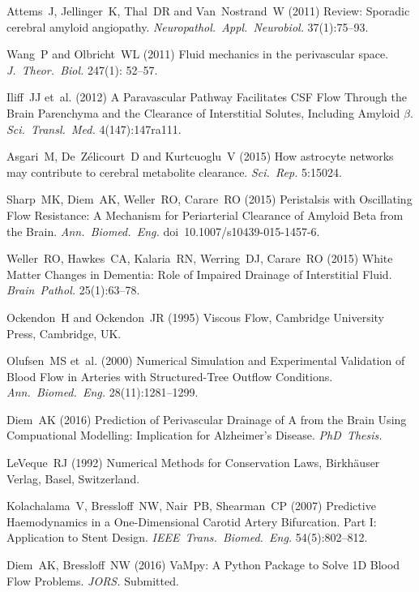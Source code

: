\documentclass{frontiersFPHY} %
\newcommand{\Ab}{A\textbeta\xspace}
\begin{document}
\begin{thebibliography}{10}
Attems~J, Jellinger~K, Thal~DR and Van~Nostrand~W (2011) Review: Sporadic cerebral amyloid angiopathy. {\em Neuropathol.~Appl.~Neurobiol.} 37(1):75--93.

Wang~P and Olbricht~WL (2011) Fluid mechanics in the perivascular space. {\em J.~Theor.~Biol.} 247(1): 52--57.

Iliff~JJ et~al. (2012) A Paravascular Pathway Facilitates CSF Flow Through the Brain Parenchyma and the Clearance of Interstitial Solutes, Including Amyloid $\beta$. {\em Sci.~Transl.~Med.} 4(147):147ra111.

Asgari~M, De~Z\'elicourt~D and Kurtcuoglu~V (2015) How astrocyte networks may contribute to cerebral metabolite clearance. {\em Sci.~Rep.} 5:15024.

Sharp~MK, Diem~AK, Weller~RO, Carare~RO (2015) Peristalsis with Oscillating Flow Resistance: A Mechanism for Periarterial Clearance of Amyloid Beta from the Brain. {\em Ann.~Biomed.~Eng.} doi~10.1007/s10439-015-1457-6.

Weller~RO, Hawkes~CA, Kalaria~RN, Werring~DJ, Carare~RO (2015) White Matter Changes in Dementia: Role of Impaired Drainage of Interstitial Fluid. {\em Brain~Pathol.} 25(1):63--78.

Ockendon~H and Ockendon~JR (1995) Viscous Flow, Cambridge University Press, Cambridge, UK.

Olufsen~MS et~al. (2000) Numerical Simulation and Experimental Validation of Blood Flow in Arteries with Structured-Tree Outflow Conditions. {\em Ann.~Biomed.~Eng.} 28(11):1281--1299.

Diem~AK (2016) Prediction of Perivascular Drainage of \Ab from the Brain Using Compuational Modelling: Implication for Alzheimer's Disease. {\em PhD~Thesis.}

LeVeque~RJ (1992) Numerical Methods for Conservation Laws, Birkh\"auser Verlag, Basel, Switzerland.

Kolachalama~V, Bressloff~NW, Nair~PB, Shearman~CP (2007) Predictive Haemodynamics in a One-Dimensional Carotid Artery Bifurcation. Part I: Application to Stent Design. {\em IEEE~Trans.~Biomed.~Eng.} 54(5):802--812.

Diem~AK, Bressloff~NW (2016) VaMpy: A Python Package to Solve 1D Blood Flow Problems. {\em JORS.} Submitted.


\end{thebibliography}
\end{document}
